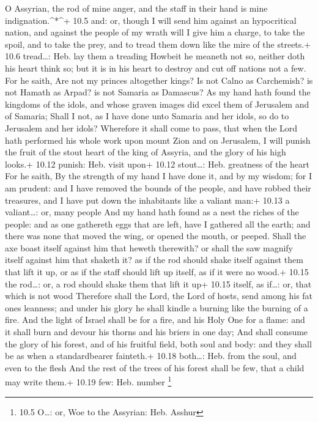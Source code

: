  O Assyrian, the rod of mine anger, and the staff in their
hand is mine indignation.\^{}*\^{}+ 10.5 and: or, though  I
will send him against an hypocritical nation, and against the people of
my wrath will I give him a charge, to take the spoil, and to take the
prey, and to tread them down like the mire of the streets.+ 10.6
tread\ldots: Heb. lay them a treading  Howbeit he meaneth
not so, neither doth his heart think so; but it is in his heart to
destroy and cut off nations not a few.  For he saith, Are
not my princes altogether kings?  Is not Calno as
Carchemish? is not Hamath as Arpad? is not Samaria as Damascus?
 As my hand hath found the kingdoms of the idols, and whose
graven images did excel them of Jerusalem and of Samaria; 
Shall I not, as I have done unto Samaria and her idols, so do to
Jerusalem and her idols?  Wherefore it shall come to pass,
that when the Lord hath performed his whole work upon mount Zion and on
Jerusalem, I will punish the fruit of the stout heart of the king of
Assyria, and the glory of his high looks.+ 10.12 punish: Heb. visit
upon+ 10.12 stout\ldots: Heb. greatness of the heart  For
he saith, By the strength of my hand I have done it, and by my wisdom;
for I am prudent: and I have removed the bounds of the people, and have
robbed their treasures, and I have put down the inhabitants like a
valiant man:+ 10.13 a valiant\ldots: or, many people  And
my hand hath found as a nest the riches of the people: and as one
gathereth eggs that are left, have I gathered all the earth; and there
was none that moved the wing, or opened the mouth, or peeped.
 Shall the axe boast itself against him that heweth
therewith? or shall the saw magnify itself against him that shaketh it?
as if the rod should shake itself against them that lift it up, or as if
the staff should lift up itself, as if it were no wood.+ 10.15 the
rod\ldots: or, a rod should shake them that lift it up+ 10.15 itself, as
if\ldots: or, that which is not wood  Therefore shall the
Lord, the Lord of hosts, send among his fat ones leanness; and under his
glory he shall kindle a burning like the burning of a fire.
 And the light of Israel shall be for a fire, and his Holy
One for a flame: and it shall burn and devour his thorns and his briers
in one day;  And shall consume the glory of his forest, and
of his fruitful field, both soul and body: and they shall be as when a
standardbearer fainteth.+ 10.18 both\ldots: Heb. from the soul, and even
to the flesh  And the rest of the trees of his forest shall
be few, that a child may write them.+ 10.19 few: Heb. number \footnote{10.5
  O\ldots: or, Woe to the Assyrian: Heb. Asshur}


